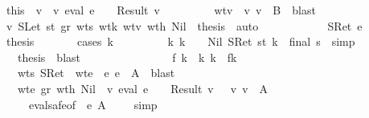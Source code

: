 \begin{isabellebody}
\ \ \ \ \ \ \isamarkupfalse \ this\ \isamarkupfalse \ v\ \ v{\isacharcolon}\ {\isachardoublequoteopen}eval\ e\ {\isasymrho}\ {\isasymmu}\ {\isacharequal}\ Result\ v{\isachardoublequoteclose}\isanewline
\ \ \ \ \ \ \ \ \ wtv{\isacharcolon}\ {\isachardoublequoteopen}{\isasymSigma}\ {\isasymturnstile}v\ v\ {\isacharcolon}\ B{\isachardoublequoteclose}\ \isamarkupfalse \ blast\isanewline
\ \ \ \ \ \ \isamarkupfalse \ v\ SLet\ st\ gr\ wts{}\ wt{\isacharunderscore}k\ wtv\ wt{\isacharunderscore}h\ Nil\ \isamarkupfalse \ {\isacharquery}thesis\ \isamarkupfalse \ auto\isanewline
\ \ \ \ \isamarkupfalse \isanewline
\ \ \ \ \ \ \isamarkupfalse \ {\isacharparenleft}SRet\ e{\isacharparenright}\isanewline
\ \ \ \ \ \ \isamarkupfalse \ {\isacharquery}thesis\isanewline
\ \ \ \ \ \ \isamarkupfalse \ {\isacharparenleft}cases\ k{\isacharparenright}\isanewline
\ \ \ \ \ \ \ \ \isamarkupfalse \ k{\isacharcolon}\ {\isachardoublequoteopen}k\ {\isacharequal}\ {\isacharbrackleft}{\isacharbrackright}{\isachardoublequoteclose}\ \isamarkupfalse \ Nil\ SRet\ st\ k\ \isamarkupfalse \ {\isachardoublequoteopen}final\ s{\isachardoublequoteclose}\ \isamarkupfalse \ simp\isanewline
\ \ \ \ \ \ \ \ \isamarkupfalse \ {\isacharquery}thesis\ \isamarkupfalse \ blast\isanewline
\ \ \ \ \ \ \isamarkupfalse \isanewline
\ \ \ \ \ \ \ \ \isamarkupfalse \ f\ k{\isacharprime}\ \isamarkupfalse \ k{\isacharcolon}\ {\isachardoublequoteopen}k\ {\isacharequal}\ f{\isacharhash}k{\isacharprime}{\isachardoublequoteclose}\isanewline
\ \ \ \ \ \ \ \ \isamarkupfalse \ wts\ SRet\ \isamarkupfalse \ wte{\isacharcolon}\ {\isachardoublequoteopen}{\isasymGamma}\ {\isasymturnstile}\isactrlisub e\ e\ {\isacharcolon}\ A{\isacharprime}{\isachardoublequoteclose}\ \isamarkupfalse \ blast\isanewline
\ \ \ \ \ \ \ \ \isamarkupfalse \ wte\ gr\ wt{\isacharunderscore}h\ Nil\ \isamarkupfalse \ {\isachardoublequoteopen}{\isacharparenleft}{\isasymexists}v{\isachardot}\ eval\ e\ {\isasymrho}\ {\isasymmu}\ {\isacharequal}\ Result\ v\ {\isasymand}\ {\isasymSigma}\ {\isasymturnstile}v\ v\ {\isacharcolon}\ A{\isacharprime}{\isacharparenright}{\isachardoublequoteclose}\isanewline
\ \ \ \ \ \ \ \ \ \ \isamarkupfalse \ eval{\isacharunderscore}safe{\isacharbrackleft}of\ {\isasymGamma}\ e\ A{\isacharprime}\ {\isasymSigma}\ {\isasymrho}\ {\isasymmu}{\isacharbrackright}\ \isamarkupfalse \ simp\isanewline

\end{isabellebody}
